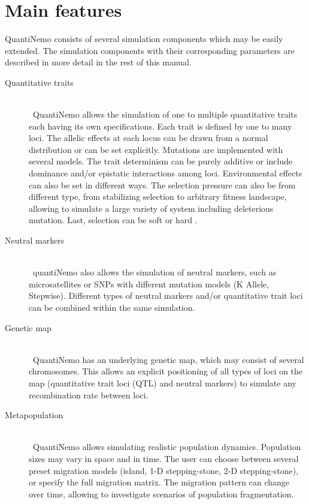 \documentclass[letterpaper,12pt,oneside]{book}
\begin{document}
\section{Main features}
QuantiNemo consists of several simulation components which may be easily extended. The simulation components with their corresponding parameters are described in more detail in the rest of this manual. 


\begin{description}
\item[Quantitative traits]\hspace*{\fill}\\\
QuantiNemo allows the simulation of one to multiple quantitative traits each having its own specifications. Each trait is defined by one to many loci. The allelic effects at each locus can be drawn from a normal distribution or can be set explicitly. Mutations are implemented with several models. The trait determinism can be purely additive or include dominance and/or epistatic interactions among loci. Environmental effects can also be set in different ways. The selection pressure can also be from different type, from stabilizing selection to arbitrary fitness landscape, allowing to simulate a large variety of system including deleterious mutation. Last, selection can be soft or hard \citep{Wallace_1968}.

\item[Neutral markers]\hspace*{\fill}\\\
quantiNemo also allows the simulation of neutral markers, such as microsatellites or SNPs with different mutation models (K Allele, Stepwise).
Different types of neutral markers and/or quantitative trait loci can be combined within the same simulation.

\item[Genetic map]\hspace*{\fill}\\\
QuantiNemo has an underlying genetic map, which may consist of several chromosomes. This allows an explicit positioning of all types of loci on the map (quantitative trait loci (QTL) and neutral markers) to simulate any recombination rate between loci. 

\item[Metapopulation]\hspace*{\fill}\\\
QuantiNemo allows simulating realistic population dynamics. Population sizes may vary in space and in time. The user can choose between several preset migration models (island, 1-D stepping-stone, 2-D stepping-stone), or specify the full migration matrix. The migration pattern can change over time, allowing to investigate scenarios of population fragmentation.


\end{description}
\end{document}

